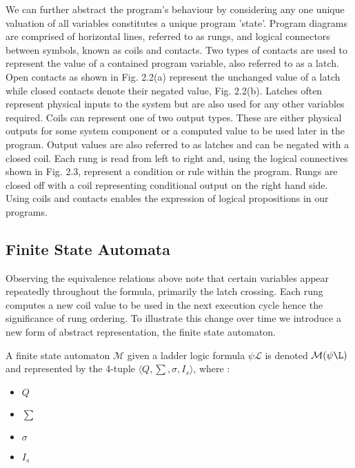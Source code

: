 \documentclass[runningheads]{llncs}
\begin{document}
We can further abstract the program's behaviour by considering any one unique valuation of all variables constitutes a unique program 'state'. Program diagrams are comprised of horizontal lines, referred
to as rungs, and logical connectors between symbols, known as coils and contacts. Two types of contacts are used to represent the value of a contained program variable, also referred to as a latch. Open contacts as shown in Fig. 2.2(a) represent the unchanged value of a latch while closed contacts denote their negated value, Fig. 2.2(b). Latches often represent physical inputs to the system but are also used for any other variables required. Coils can represent one of two output types. These are either physical outputs
for some system component or a computed value to be used later in the program. Output values are also referred to as latches and can be negated with a closed coil. Each rung is read from left to right and, using the logical connectives shown in Fig. 2.3, represent a condition or rule within the program. Rungs are closed off with a coil representing conditional output on the right hand side. Using coils and contacts enables the expression of logical propositions in our programs. 

\subsection{Finite State Automata}
Observing the equivalence relations above note that certain variables appear repeatedly
throughout the formula, primarily the latch crossing. Each rung computes a new coil
value to be used in the next execution cycle hence the significance of rung ordering. To illustrate this change over time we introduce a new form of abstract representation, the finite state automaton.

\begin{definition}
	A finite state automaton $\mathcal{M}$ given a ladder logic formula $\psi\mathcal{L}$ is denoted $\mathcal{M(\psi\L)}$ and represented by the 4-tuple $\langle Q, \sum, \sigma, I_s \rangle$, where :
	\begin{itemize}
		\item $Q$ 
		\item $\sum$
		\item $\sigma$
		\item $I_s$
	\end{itemize}
\end{definition}
\end{document}
